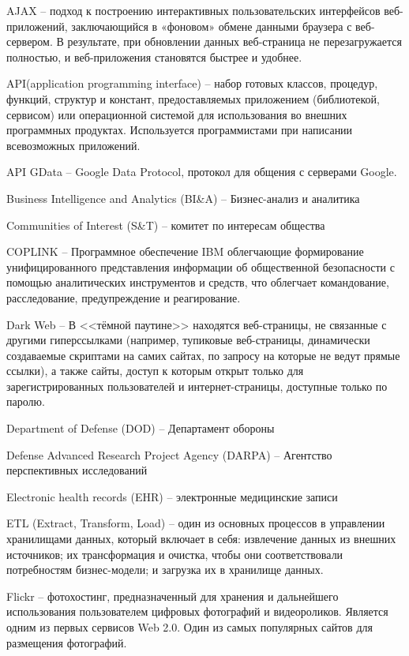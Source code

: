 AJAX -- подход к построению интерактивных пользовательских интерфейсов веб-приложений, заключающийся в «фоновом» обмене данными браузера с веб-сервером. В результате, при обновлении данных веб-страница не перезагружается полностью, и веб-приложения становятся быстрее и удобнее.

API(application programming interface) -- набор готовых классов, процедур, функций, структур и констант, предоставляемых приложением (библиотекой, сервисом) или операционной системой для использования во внешних программных продуктах. Используется программистами при написании всевозможных приложений.

API GData -- Google Data Protocol, протокол для общения с серверами Google.

Business Intelligence and Analytics (BI\&A) -- Бизнес-анализ и аналитика

Communities of Interest (S\&T) -- комитет по интересам общества

COPLINK -- Программное обеспечение IBM облегчающие формирование унифицированного представления информации об общественной безопасности с помощью аналитических инструментов и средств, что облегчает командование, расследование, предупреждение и реагирование.

Dark Web -- В <<тёмной паутине>> находятся веб-страницы, не связанные с другими гиперссылками (например, тупиковые веб-страницы, динамически создаваемые скриптами на самих сайтах, по запросу на которые не ведут прямые ссылки), а также сайты, доступ к которым открыт только для зарегистрированных пользователей и интернет-страницы, доступные только по паролю.

Department of Defense (DOD) -- Департамент обороны

Defense Advanced Research Project Agency (DARPA) -- Агентство перспективных исследований

Electronic health records (EHR) -- электронные медицинские записи

ETL (Extract, Transform, Load) --  один из основных процессов в управлении хранилищами данных, который включает в себя: извлечение данных из внешних источников; их трансформация и очистка, чтобы они соответствовали потребностям бизнес-модели; и загрузка их в хранилище данных.

Flickr --  фотохостинг, предназначенный для хранения и дальнейшего использования пользователем цифровых фотографий и видеороликов. Является одним из первых сервисов Web 2.0. Один из самых популярных сайтов для размещения фотографий.

